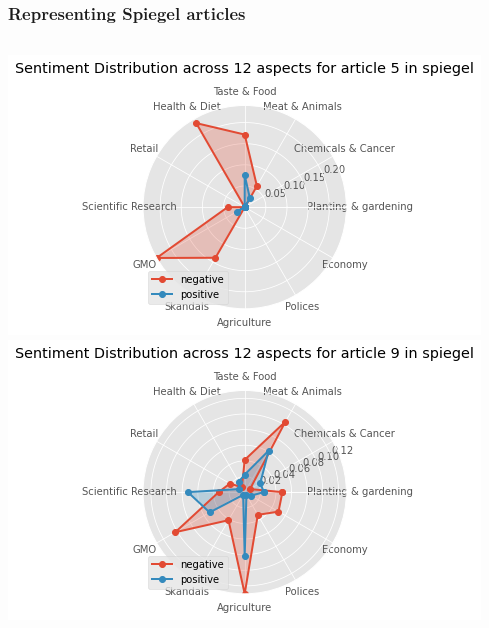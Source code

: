 \documentclass{tum-presentation}
\begin{document}
\begin{frame}
  \frametitle{Representing Spiegel articles}
  \begin{columns}[t]
    \centering
    \includegraphics[width = \textwidth]{figures/radar_spiegel_5.png}\\
    \centering
    \includegraphics[width = \textwidth]{figures/radar_spiegel_9.png}
    \end{columns}
    
\end{frame}
\end{document}
